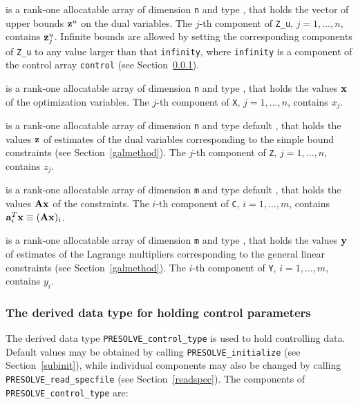 \documentclass{galahad}
\newcommand{\packagename}{PRESOLVE}
\begin{document}
\begin{description}
 is a rank-one allocatable array of dimension {\tt n} and type
\realdp, that holds
the vector of upper bounds ${\mathbf{z}}^{u}$ on the dual variables.
The $j$-th component of {\tt Z\_u}, $j = 1, \ldots , n$,
contains ${\mathbf{z}}_{j}^{u}$.
Infinite bounds are allowed by setting the corresponding
components of {\tt Z\_u} to any value larger than that {\tt infinity},
where {\tt infinity} is a component of the control array {\tt control}
(see Section~\ref{typecontrol}).

 is a rank-one allocatable array of dimension {\tt n} and type
\realdp,
that holds the values ${\mathbf{x}}$ of the optimization variables.
The $j$-th component of {\tt X}, $j = 1,  \ldots , n$, contains $x_{j}$.

 is a rank-one allocatable array of dimension {\tt n} and type default
\realdp, that holds
the values ${\mathbf{z}}$ of estimates  of the dual variables
corresponding to the simple bound constraints (see Section~\ref{galmethod}).
The $j$-th component of {\tt Z}, $j = 1,  \ldots ,  n$, contains $z_{j}$.

 is a rank-one allocatable array of dimension {\tt m} and type default
\realdp, that holds
the values ${\mathbf{A}} {\mathbf{x}}$ of the constraints.
The $i$-th component of {\tt C}, $i = 1,  \ldots ,  m$, contains
${\mathbf{a}}_{i}^{T}{\mathbf{x}} \equiv ({\mathbf{A}} {\mathbf{x}})_{i}$.

 is a rank-one allocatable array of dimension {\tt m} and type
\realdp, that holds
the values ${\mathbf{y}}$ of estimates  of the Lagrange multipliers
corresponding to the general linear constraints (see Section~\ref{galmethod}).
The $i$-th component of {\tt Y}, $i = 1,  \ldots ,  m$, contains $y_{i}$.

\end{description}



\subsubsection{The derived data type for holding control
 parameters}\label{typecontrol}
The derived data type
{\tt \packagename\_control\_type}
is used to hold controlling data. Default values may be obtained by calling
{\tt \packagename\_initialize} (see Section~\ref{subinit}),
while individual components may also be changed by calling
{\tt \packagename\_read\-\_specfile}
(see Section~\ref{readspec}).
The components of
{\tt \packagename\_control\_type}
are:
\end{document}
